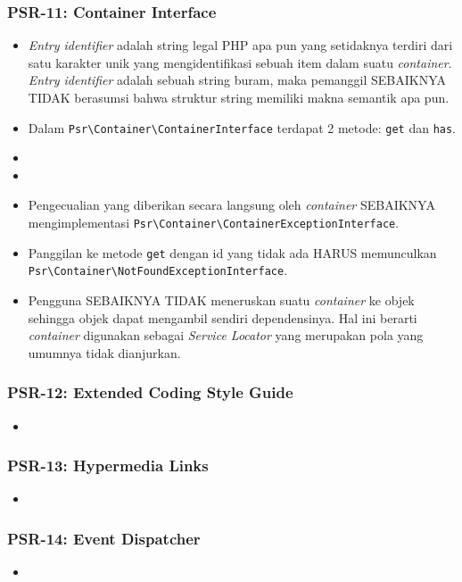 \subsubsection{PSR-11: Container Interface}
\label{subsubsec:psr11}
\begin{itemize}
	\item \textit{Entry identifier} adalah string legal PHP apa pun yang setidaknya terdiri dari satu karakter unik yang mengidentifikasi sebuah item dalam suatu \textit{container}. \textit{Entry identifier} adalah sebuah string buram, maka pemanggil SEBAIKNYA TIDAK berasumsi bahwa struktur string memiliki makna semantik apa pun.
	\item Dalam \verb|Psr\Container\ContainerInterface| terdapat 2 metode: \verb|get| dan \verb|has|.
	\item 
	\item 
	\item Pengecualian yang diberikan secara langsung oleh \textit{container} SEBAIKNYA mengimplementasi \verb|Psr\Container\ContainerExceptionInterface|.
	\item Panggilan ke metode \verb|get| dengan id yang tidak ada HARUS memunculkan \verb|Psr\Container\NotFoundExceptionInterface|.
	\item Pengguna SEBAIKNYA TIDAK meneruskan suatu \textit{container} ke objek sehingga objek dapat mengambil sendiri dependensinya. Hal ini berarti \textit{container} digunakan sebagai \textit{Service Locator} yang merupakan pola yang umumnya tidak dianjurkan.
\end{itemize}

\subsubsection{PSR-12: Extended Coding Style Guide}
\label{subsubsec:psr12}
\begin{itemize}
	\item
\end{itemize}

\subsubsection{PSR-13: Hypermedia Links}
\label{subsubsec:psr13}
\begin{itemize}
	\item
\end{itemize}

\subsubsection{PSR-14: Event Dispatcher}
\label{subsubsec:psr14}
\begin{itemize}
	\item
\end{itemize}

